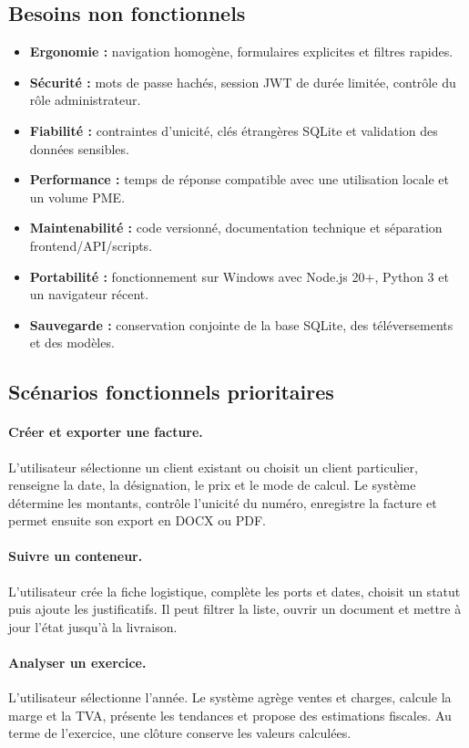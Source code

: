 \documentclass[12pt,a4paper,oneside]{report}
\begin{document}
\subsection{Besoins non fonctionnels}
\begin{itemize}
  \item \textbf{Ergonomie :} navigation homogène, formulaires explicites et filtres rapides.
  \item \textbf{Sécurité :} mots de passe hachés, session JWT de durée limitée, contrôle du rôle administrateur.
  \item \textbf{Fiabilité :} contraintes d'unicité, clés étrangères SQLite et validation des données sensibles.
  \item \textbf{Performance :} temps de réponse compatible avec une utilisation locale et un volume PME.
  \item \textbf{Maintenabilité :} code versionné, documentation technique et séparation frontend/API/scripts.
  \item \textbf{Portabilité :} fonctionnement sur Windows avec Node.js 20+, Python 3 et un navigateur récent.
  \item \textbf{Sauvegarde :} conservation conjointe de la base SQLite, des téléversements et des modèles.
\end{itemize}

\subsection{Scénarios fonctionnels prioritaires}
\paragraph{Créer et exporter une facture.}
L'utilisateur sélectionne un client existant ou choisit un client particulier, renseigne la date, la désignation, le prix et le mode de calcul. Le système détermine les montants, contrôle l'unicité du numéro, enregistre la facture et permet ensuite son export en DOCX ou PDF.

\paragraph{Suivre un conteneur.}
L'utilisateur crée la fiche logistique, complète les ports et dates, choisit un statut puis ajoute les justificatifs. Il peut filtrer la liste, ouvrir un document et mettre à jour l'état jusqu'à la livraison.

\paragraph{Analyser un exercice.}
L'utilisateur sélectionne l'année. Le système agrège ventes et charges, calcule la marge et la TVA, présente les tendances et propose des estimations fiscales. Au terme de l'exercice, une clôture conserve les valeurs calculées.
\end{document}
